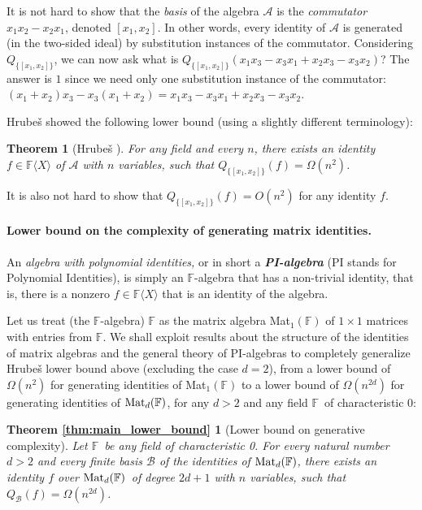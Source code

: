 \documentclass[12pt,reqno]{article}
\newcounter{tmpt}
\newtheorem{theorem}{Theorem}
\newtheorem*{main-lower-bound}{Theorem \ref{thm:main_lower_bound}}
\newcommand\F{\ensuremath{\mathbb F}}
\newcommand {\para}[1] {\paragraph{#1}}
\newcommand{\matd}{{\ensuremath{{\rm Mat}_d(\F)}}}
\newcommand{\mattwo}{{\ensuremath{{\rm Mat}_2(\F)}}}
\newcommand{\freea}{\ensuremath{\F\langle X\rangle}}
\newenvironment{comment}{\QuadSpace\par\noindent{\bf Comment}:}{\HalfSpace}
\newcommand{\QuadSpace}{\vspace{0.25\baselineskip}}
\newcommand{\HalfSpace}{\vspace{0.5\baselineskip}}
\begin{document}
It is not hard to show that the \textit{basis }of the algebra $\mathscr A$ is the \textit{commutator }$x_1 x_2 -x_2 x_1$, denoted $[x_1,x_2]$. In other words, every identity of $\mathscr A$ is generated (in the two-sided ideal) by substitution instances of the commutator. Considering $Q_{\{[x_1,x_2]\}}$, we can now ask what is $Q_{\{[x_1,x_2]\}}(x_1x_3-x_3x_1+x_2x_3-x_3x_2)$? The answer is $1$ since we need only one substitution instance of the commutator: $(x_1+x_2)x_3-x_3(x_1+x_2)=x_1x_3-x_3x_1+
x_2x_3-x_3x_2$.
\bigskip

 Hrube\v s \cite{Hru11} showed the following lower bound (using a slightly different terminology):

\setcounter{tmpt}{\thetheorem}
\begin{theorem}[Hrube\v s \cite{Hru11}]\label{thm:Hrubes} For any field and every $n$, there exists an identity $f\in\freea$ of $\mathscr A$  with $n$ variables, such that $Q_{\{[x_1,x_2]\}}(f) = \Omega(n^2)$.
\end{theorem}

It is also not hard to show that $Q_{\{[x_1,x_2]\}}(f) = O(n^2)$ for any identity $f$.

\para{Lower bound on the complexity of generating matrix identities.}

%

An \textit{algebra with polynomial identities, }or in short a \textbf{\textit{PI-algebra}} (PI stands for  Polynomial Identities), is  simply an \F-algebra that has a non-trivial identity, that is, there is a nonzero $f\in\freea$ that is an identity of the algebra.

Let us treat (the \F-algebra) $\F$ as the matrix algebra Mat$_1(\F)$ of $1\times 1$ matrices with entries from \F.
We shall exploit results about the structure of the identities of matrix algebras and the general theory of PI-algebras to completely generalize Hrube\v s \cite{Hru11} lower bound above (excluding the case $d=2$), from a lower bound of \(\Omega(n^2)\) for generating identities of Mat$_1(\F)$ to a lower bound of $\Omega(n^{2d})$ for generating identities of \matd, for any $d>2$ and any field \F \ of characteristic 0:

\begin{main-lower-bound}[Lower bound on generative complexity]
Let \F\ be any field of characteristic 0.
For every natural number $d>2$ and  every finite basis \(\mathcal B\) of the  identities of  \matd, there exists an identity \(f\) over \matd\ of degree $2d+1$ with $n$ variables, such that $Q_{\mathcal B}(f)=\Omega(n^{2d})$.
\end{main-lower-bound}
%
\end{document}

